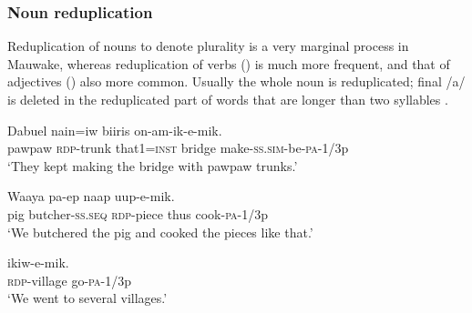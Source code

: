 
\subsubsection{Noun reduplication}\label{sec:3.2.6.2}
{}
Reduplication of nouns to denote plurality is a very marginal process in Mauwake, whereas reduplication of verbs () is much more frequent, and that of adjectives () also more common. Usually the whole noun is reduplicated; final /a/ is deleted in the reduplicated part of words that are longer than two syllables . 

\ea%
\label{ex:3:x68}
\gll Dabuel  nain=iw biiris on-am-ik-e-mik. \\
pawpaw \textsc{rdp}-trunk that1=\textsc{inst} bridge make-\textsc{ss}.\textsc{sim}-be-\textsc{pa}-1/3p\\
\glt`They kept making the bridge with pawpaw trunks.'
\z

\ea%
\label{ex:3:x69}
\gll Waaya pa-ep  naap uup-e-mik. \\
pig butcher-\textsc{ss}.\textsc{seq} \textsc{rdp}-piece thus cook-\textsc{pa}-1/3p\\
\glt`We butchered the pig and cooked the pieces like that.'
\z

\ea%
\label{ex:3:x426}
\gll {} ikiw-e-mik. \\
\textsc{rdp}-village go-\textsc{pa}-1/3p\\
\glt`We went to several villages.'
\z

